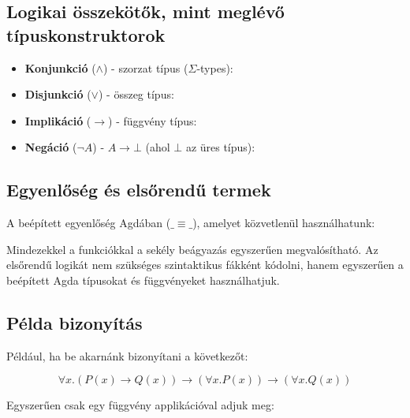 \subsection{Logikai összekötők, mint meglévő típuskonstruktorok}

\begin{itemize}
    \item \textbf{Konjunkció} ($\land$) - szorzat típus ($\Sigma$-types):
\miscConjunction{}
    \item \textbf{Disjunkció} ($\lor$) - összeg típus:
\miscDisjunction{}
    \item \textbf{Implikáció} ($\rightarrow$) - függvény típus:
\miscImplication{}
    \item \textbf{Negáció} ($\neg A$) - $ A \rightarrow \bot $ (ahol $\bot$ az üres típus):
\miscNegation{}
\end{itemize}

\subsection{Egyenlőség és elsőrendű termek}

A beépített egyenlőség Agdában ($ \_≡\_ $), amelyet közvetlenül használhatunk:

\miscEquality{}

Mindezekkel a funkciókkal a sekély beágyazás egyszerűen megvalósítható. Az elsőrendű logikát nem szükséges szintaktikus fákként kódolni, hanem egyszerűen a beépített Agda típusokat és függvényeket használhatjuk.

\subsection{Példa bizonyítás}

Például, ha be akarnánk bizonyítani a következőt:

\[ \forall x. (P(x) \rightarrow Q(x)) \rightarrow (\forall x. P(x)) \rightarrow (\forall x. Q(x)) \]

Egyszerűen csak egy függvény applikációval adjuk meg:

\miscExLemma{}